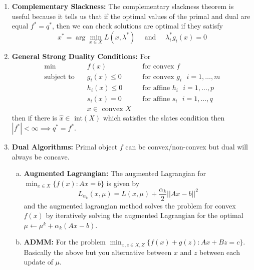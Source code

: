 \documentclass{article}
\begin{document}
\begin{enumerate}
    \item \textbf{Complementary Slackness:} The complementary slackness theorem is useful because it tells us that if the optimal values of the primal and dual are equal \(f^*  = q^*\), then we can check solutions are optimal if they satisfy
    \[
    x^* =  \arg \min_{x \in X} L(x, \lambda^*) \quad \text{ and } \quad \lambda_i^* g_i(x)=0
    \]
    \item \textbf{General Strong Duality Conditions:} For
    \[
        \begin{aligned}
        \min\quad & f(x) && \text{for convex }f\\
        \text{subject to} \quad & g_i(x) \leq 0 && \text{for  convex $g_i$ } i = 1, \dots, m \\
        & h_i(x) \leq 0 && \text{for affine $h_i$  } i = 1, \dots, p \\
        & s_i(x) = 0 && \text{for affine $s_i$ } i = 1, \dots, q\\
        & x \in \text{ convex }X
        \end{aligned}
    \]
    then if there is \(\hat x\in \) int\((X)\) which satisfies the slates condition then \(|f^*|< \infty \implies q^* =f^*\).

    \item \textbf{Dual Algorithms:} Primal object \(f\) can be convex/non-convex but dual will always be concave.
    \begin{enumerate} [a.]
        \item \textbf{Augmented Lagrangian:} The augmented Lagrangian for \(\min_{x \in X} \{f(x):Ax = b\}\) is given by
        \[
        L_{\alpha_k}(x,\mu) = L(x, \mu) + \frac{\alpha_k}{2}||Ax-b||^2
        \]
        and the augmented lagrangian method solves the problem for convex \(f(x)\) by iteratively solving the augmented Lagrangian for the optimal \(\mu \leftarrow \mu^k + \alpha_k(Ax-b)\).
        \item \textbf{ADMM:} For the problem \(\min_{x, z \in X, Z} \{f(x) + g(z):Ax + Bz = c\}\). Basically the above but you alternative between \(x\) and \(z\) between each update of \(\mu\).
    \end{enumerate}
\end{enumerate}
\end{document}
